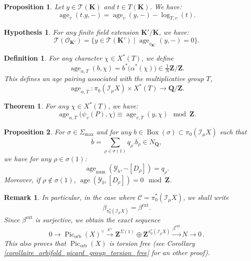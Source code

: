 \documentclass[10pt,a4paper]{amsart}
\newtheorem{definition}{Definition}
\newtheorem{prop}{Proposition}
\newtheorem{hypothesis}{Hypothesis}
\newtheorem{theorem}{Theorem}
\newtheorem{remark}{Remark}
\DeclareMathOperator{\Boxe}{Box}
\newcommand{\K}{\mathbf{K}}
\DeclareMathOperator{\Pic}{Pic}
\newcommand{\Q}{\mathbf{Q}}
\newcommand{\Z}{\mathbf{Z}}
\DeclareMathOperator{\age}{age}
\DeclareMathOperator{\ext}{ext}
\DeclareMathOperator{\num}{num}
\DeclareMathOperator{\orb}{orb}
\newcommand{\sector}{\pi_0(\sheafI_{\mu} X)}
\newcommand{\sheafI}{\mathcal{I}}
\newcommand{\sheafO}{\mathcal{O}}
\newcommand{\stackT}{\mathcal{T}}
\newcommand{\stackY}{\mathcal{Y}}
\newcommand{\twistsector}{\pi_0^*(\sheafI_{\mu} X)}
\begin{document}
\begin{prop}\label{prop_age_and_logarithm}
    Let $y \in \stackT(\K)$ and $t \in T(\K)$. We have:
    $$\age_v(t.y,-) = \age_v(y,-) - \log_{T,v}(t) .$$
\end{prop}

\begin{hypothesis}\label{hypothesis_zero_of_local_degree}
    For any finite field extension $\K' / \K$, we have:
    $$\stackT(\sheafO_{\K'}) = \{y \in \stackT(\K') \mid \age_{v_{\K'}}(y,-) = 0 \} . $$
\end{hypothesis}

\begin{definition}\label{definition_general_age_pairing}
For any character $\chi \in X^*(T)$, we define
\[
\age_{\alpha,T}(b,\chi) = b^*\bigl(\alpha^*(\chi)\bigr) \in \tfrac{1}{N}\Z/\Z.
\]
This defines an age pairing associated with the multiplicative group $T$,
\[
\age_{\alpha,T} : \sector \times X^*(T) \longrightarrow \Q/\Z.
\]
\end{definition}

\begin{theorem}\label{theorem_age_extended_universal_torsor}
For any $\chi \in X^{*}(T)$, we have:
\[
\age_{\alpha,T}\bigl(\psi_v(P),\chi\bigr) \equiv \age_{v,T}(y,\chi) \mod \Z .
\]
\end{theorem}

\begin{prop}\label{prop_age_divisor_associated_to_an_edge}
For $\sigma \in \Sigma_{\max}$ and for any $b \in \Boxe(\sigma) \subset \sector$ such that $$\overline{b} = \sum\limits_{\rho \in \sigma(1)} q_{\rho} . \overline{b_{\rho}} \in N_{\Q},$$ we have for any $\rho \in \sigma(1)$:
$$\age_{\num}(\stackY_b,-[D_{\rho}]) = q_{\rho} .$$Moreover, if $\rho \not\in \sigma(1)$, $\age(\stackY_b,[D_{\rho}]) = 0 \mod \Z$.
\end{prop}

\begin{remark}\label{remark_exact_sequence_dual_orbifold_picard_group}
    In particular, in the case where $\mathcal{C} = \twistsector$, we shall write $$\beta_{\twistsector} = \beta^{\ext} .$$Since $\beta^{\ext}$ is surjective, we obtain the exact sequence
\[
0 \longrightarrow \Pic_{\orb}(X)^{\vee} \xrightarrow{\pi^{\vee}} \Z^{\Sigma(1)} \oplus \Z^{\twistsector} \xrightarrow{\beta^{\ext}} N \longrightarrow 0 \, .
\]This also proves that $\Pic_{\orb}(X)$ is torsion free (see Corollary \ref{corollaire_orbifold_picard_group_torsion_free} for an other proof). 

\end{remark}
\end{document}
